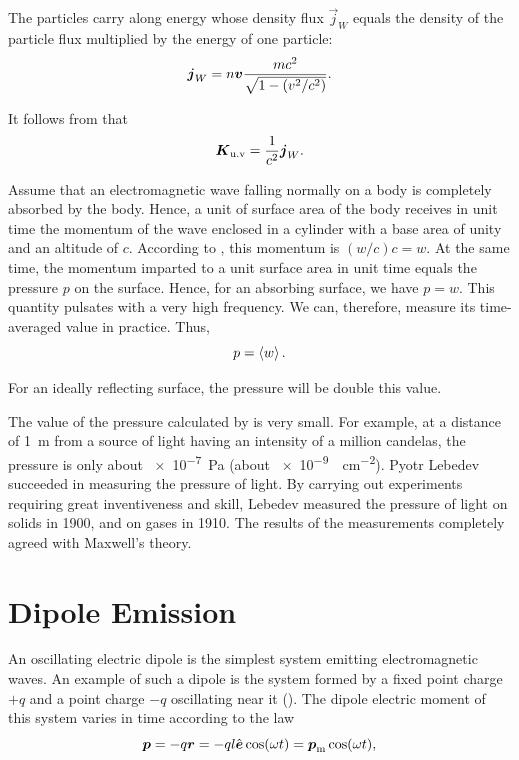 \noindent
The particles carry along energy whose density flux $\vec{j}_W$ equals the density of the particle flux multiplied by the energy of one particle:
\begin{equation}\label{eq:15_39}
    \boldsymbol{j}_W = n \boldsymbol{v} \frac{mc^2}{\sqrt{1 - \left(v^2/c^2\right)}}.
\end{equation}

\noindent
It follows from  that
\begin{equation}\label{eq:15_40}
    \boldsymbol{K}_{\text{u.v}} = \frac{1}{c^2} \boldsymbol{j}_W.
\end{equation}

Assume that an electromagnetic wave falling normally on a body is completely absorbed by the body.
Hence, a unit of surface area of the body receives in unit time the momentum of the wave enclosed in a cylinder with a base area of unity and an altitude of $c$.
According to , this momentum is $(w/c)c=w$.
At the same time, the momentum imparted to a unit surface area in unit time equals the pressure $p$ on the surface.
Hence, for an absorbing surface, we have $p = w$.
This quantity pulsates with a very high frequency.
We can, therefore, measure its time-averaged value in practice. Thus,
\begin{equation}\label{eq:15_41}
    p = \left\langle w \right\rangle.
\end{equation}

\noindent
For an ideally reflecting surface, the pressure will be double this value.

The value of the pressure calculated by  is very small.
For example, at a distance of \SI{1}{\metre} from a source of light having an intensity of a million candelas, the pressure is only about \SI{e-7}{\pascal} (about \SI{e-9}{\gf\per\centi\metre\squared}).
Pyotr Lebedev succeeded in measuring the pressure of light.
By carrying out experiments requiring great inventiveness and skill, Lebedev measured the pressure of light on solids in 1900, and on gases in 1910.
The results of the measurements completely agreed with Maxwell's theory.

\section{Dipole Emission}\label{sec:15_6}

An oscillating electric dipole is the simplest system emitting electromagnetic waves.
An example of such a dipole is the system formed by a fixed point charge $+q$ and a point charge $-q$ oscillating near it ().
The dipole electric moment of this system varies in time according to the law
\begin{equation}\label{eq:15_42}
    \boldsymbol{p} = -q \boldsymbol{r} = - ql \hat{\boldsymbol{e}} \cos(\omega t) = \boldsymbol{p}_{\text{m}} \cos(\omega t),
\end{equation}

